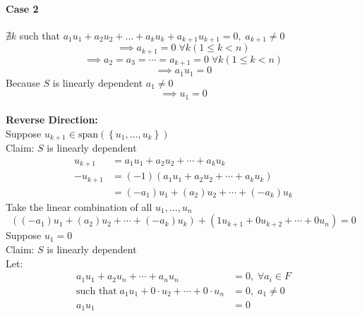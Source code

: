\paragraph{Case 2} $\nexists k$ such that $a_1u_1 +a_2u_2
+\dots+a_ku_k+a_{k+1}u_{k+1}=0,\; a_{k+1}\neq 0$
\begin{equation}
\implies a_{k+1}=0 \; \forall k(1 \leq k< n) 
\end{equation}
\begin{equation}
\implies a_2=a_3=\cdots=a_{k+1}=0\;\forall k (1\leq k < n)
\end{equation}
\begin{equation}
\implies a_1u_1 = 0
\end{equation}
Because $S$ is linearly dependent $a_1\neq 0$ 
\begin{equation}
\implies  u_1 = 0
\end{equation}
\\
\textbf{Reverse Direction:}\\
Suppose $u_{k+1} \in \text{span}(\left\{u_1,\dots,u_k\right\})$
\\Claim: $S$ is linearly dependent 
\begin{align}
u_{k+1}  &= a_1u_1 + a_2u_2 + \cdots + a_ku_k\\
-u_{k+1} &= \left(-1\right)\left(a_1u_1 + a_2u_2 + \cdots +
  a_ku_k\right)\\
&= \left(-a_1\right)u_1 + \left(a_2\right)u_2 + \cdots + \left(-a_k\right)u_k
\end{align}
Take the linear combination of all $u_1,\dots,u_n$
\begin{equation}
\left(\left(-a_1\right)u_1 + \left(a_2\right)u_2 + \cdots +
  \left(-a_k\right)u_k\right) + \left(1u_{k+1} + 0u_{k+2}
  + \cdots + 0u_n\right)=0
\end{equation}
Suppose $u_1 = 0$
\\Claim: $S$ is linearly dependent
\\Let:
\begin{align}
a_1u_1 +a_2u_n +\cdots+a_nu_n &= 0,\; \forall a_i \in F\\
\text{such that}\;a_1u_1 + 0\cdot u_2 +\cdots+0\cdot u_n &= 0,\;
a_1\neq 0\\
a_1u_1 &= 0
\end{align}
